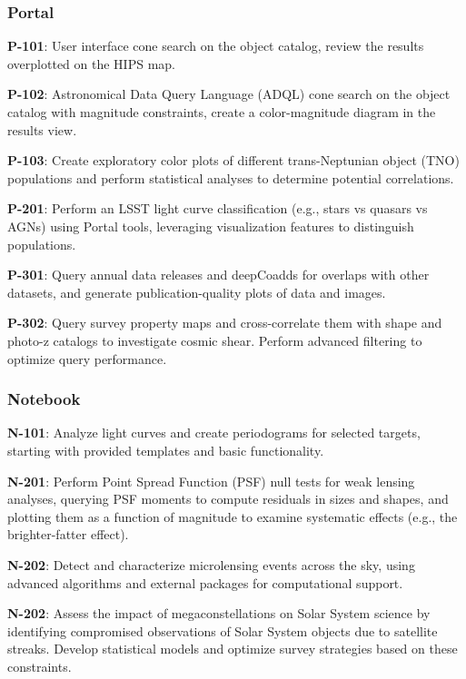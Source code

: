 
\subsubsection{Portal}

\textbf{P-101}: User interface cone search on the object catalog, review the results overplotted on the HIPS map.

\textbf{P-102}: Astronomical Data Query Language (ADQL) cone search on the object catalog with magnitude constraints, create a color-magnitude diagram in the results view.

\textbf{P-103}: Create exploratory color plots of different trans-Neptunian object (TNO) populations and perform statistical analyses to determine potential correlations. 

\textbf{P-201}: Perform an LSST light curve classification (e.g., stars vs quasars vs AGNs) using Portal tools, leveraging visualization features to distinguish populations.

\textbf{P-301}: Query annual data releases and deepCoadds for overlaps with other datasets, and generate publication-quality plots of data and images.

\textbf{P-302}: Query survey property maps and cross-correlate them with shape and photo-z catalogs to investigate cosmic shear. Perform advanced filtering to optimize query performance.

\subsubsection{Notebook}

\textbf{N-101}:  Analyze light curves and create periodograms for selected targets, starting with provided templates and basic functionality.

\textbf{N-201}: Perform Point Spread Function (PSF) null tests for weak lensing analyses, querying PSF moments to compute residuals in sizes and shapes, and plotting them as a function of magnitude to examine systematic effects (e.g., the brighter-fatter effect).

\textbf{N-202}: Detect and characterize microlensing events across the sky, using advanced algorithms and external packages for computational support.

\textbf{N-202}: Assess the impact of megaconstellations on Solar System science by identifying compromised observations of Solar System objects due to satellite streaks. Develop statistical models and optimize survey strategies based on these constraints. 

